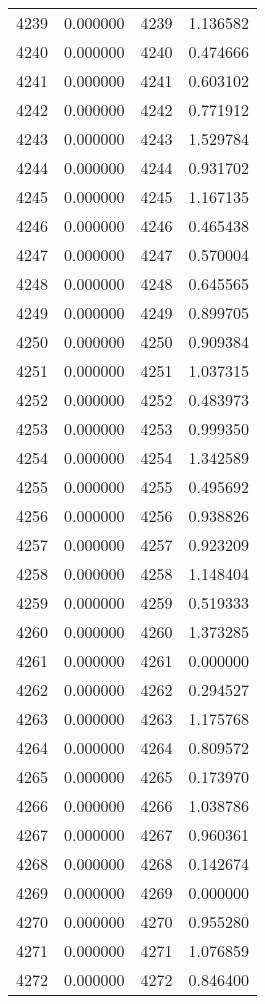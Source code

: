 \documentclass[12pt]{article}
\begin{document}
\begin{longtable}{@{}cccc@{}}
4239 & 0.000000 & 4239 & 1.136582 \\
4240 & 0.000000 & 4240 & 0.474666 \\
4241 & 0.000000 & 4241 & 0.603102 \\
4242 & 0.000000 & 4242 & 0.771912 \\
4243 & 0.000000 & 4243 & 1.529784 \\
4244 & 0.000000 & 4244 & 0.931702 \\
4245 & 0.000000 & 4245 & 1.167135 \\
4246 & 0.000000 & 4246 & 0.465438 \\
4247 & 0.000000 & 4247 & 0.570004 \\
4248 & 0.000000 & 4248 & 0.645565 \\
4249 & 0.000000 & 4249 & 0.899705 \\
4250 & 0.000000 & 4250 & 0.909384 \\
4251 & 0.000000 & 4251 & 1.037315 \\
4252 & 0.000000 & 4252 & 0.483973 \\
4253 & 0.000000 & 4253 & 0.999350 \\
4254 & 0.000000 & 4254 & 1.342589 \\
4255 & 0.000000 & 4255 & 0.495692 \\
4256 & 0.000000 & 4256 & 0.938826 \\
4257 & 0.000000 & 4257 & 0.923209 \\
4258 & 0.000000 & 4258 & 1.148404 \\
4259 & 0.000000 & 4259 & 0.519333 \\
4260 & 0.000000 & 4260 & 1.373285 \\
4261 & 0.000000 & 4261 & 0.000000 \\
4262 & 0.000000 & 4262 & 0.294527 \\
4263 & 0.000000 & 4263 & 1.175768 \\
4264 & 0.000000 & 4264 & 0.809572 \\
4265 & 0.000000 & 4265 & 0.173970 \\
4266 & 0.000000 & 4266 & 1.038786 \\
4267 & 0.000000 & 4267 & 0.960361 \\
4268 & 0.000000 & 4268 & 0.142674 \\
4269 & 0.000000 & 4269 & 0.000000 \\
4270 & 0.000000 & 4270 & 0.955280 \\
4271 & 0.000000 & 4271 & 1.076859 \\
4272 & 0.000000 & 4272 & 0.846400 \\

\end{longtable}
\end{document}
